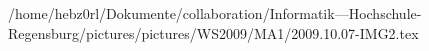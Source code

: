 /home/hebz0rl/Dokumente/collaboration/Informatik---Hochschule-Regensburg/pictures/pictures/WS2009/MA1/2009.10.07-IMG2.tex